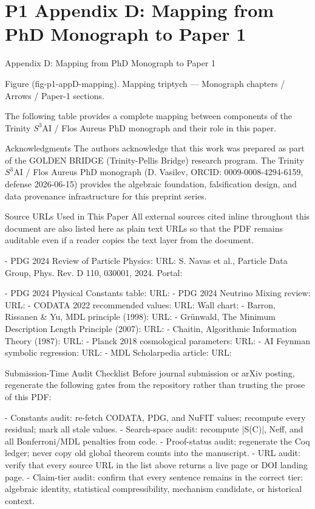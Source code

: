 
\section{P1 Appendix D: Mapping from PhD Monograph to Paper 1}

Appendix D: Mapping from PhD Monograph to Paper 1

         Figure (fig-p1-appD-mapping). Mapping triptych --- Monograph chapters / Arrows / Paper-1
                                                sections.

  The following table provides a complete mapping between components of the Trinity
  $S^{3}$AI / Flos Aureus PhD monograph and their role in this paper.

  Acknowledgments
  The authors acknowledge that this work was prepared as part of the GOLDEN BRIDGE (Trinity-Pellis Bridge)
  research program. The Trinity $S^{3}$AI / Flos Aureus PhD monograph (D. Vasilev, ORCID:
  0009-0008-4294-6159, defense 2026-06-15) provides the algebraic foundation,
  falsification design, and data provenance infrastructure for this preprint series.

  Source URLs Used in This Paper
  All external sources cited inline throughout this document are also listed here as plain
  text URLs so that the PDF remains auditable even if a reader copies the text layer from
  the document.

  - PDG 2024 Review of Particle Physics: URL:              S. Navas et al., Particle Data Group,
  Phys. Rev. D 110, 030001, 2024. Portal:

  - PDG 2024 Physical Constants table: URL:
  - PDG 2024 Neutrino Mixing review: URL:
  - CODATA 2022 recommended values: URL:            Wall chart:
  - Barron, Rissanen \& Yu, MDL principle (1998): URL:
  - Grünwald, The Minimum Description Length Principle (2007): URL:
  - Chaitin, Algorithmic Information Theory (1987): URL:
  - Planck 2018 cosmological parameters: URL:
  - AI Feynman symbolic regression: URL:
  - MDL Scholarpedia article: URL:

  Submission-Time Audit Checklist
  Before journal submission or arXiv posting, regenerate the following gates from the
  repository rather than trusting the prose of this PDF:

  - Constants audit: re-fetch CODATA, PDG, and NuFIT values; recompute every residual;
  mark all stale values.
  - Search-space audit: recompute |S(C)|, Neff, and all Bonferroni/MDL penalties from
  code.
  - Proof-status audit: regenerate the Coq ledger; never copy old global theorem counts
  into the manuscript.
  - URL audit: verify that every source URL in the list above returns a live page or DOI
  landing page.
  - Claim-tier audit: confirm that every sentence remains in the correct tier: algebraic
  identity, statistical compressibility, mechanism candidate, or historical context.

